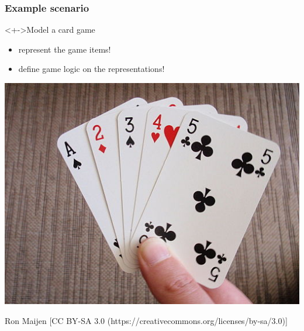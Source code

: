 \documentclass{beamer}
\begin{document}
\begin{frame}[fragile]
  \frametitle{Example scenario}
  \begin{block}<+->{Model a card game}
    \begin{itemize}
    \item represent the game items!
    \item define game logic on the representations!
    \end{itemize}
  \end{block}
  \begin{center}
    \includegraphics{pictures/AcetoFive}
  \end{center}
  \vfill
  \tiny Ron Maijen [CC BY-SA 3.0 (https://creativecommons.org/licenses/by-sa/3.0)]
\end{frame}
\end{document}
